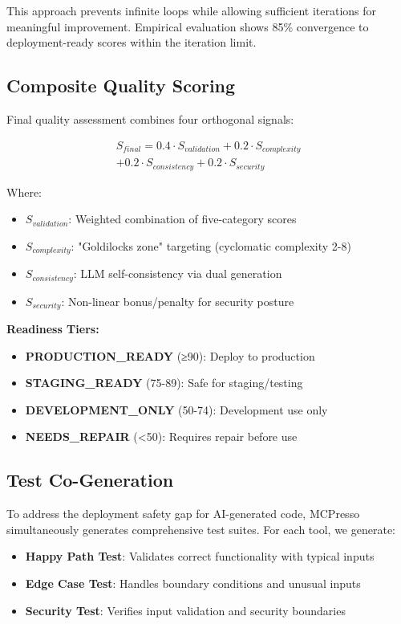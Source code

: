 \documentclass[10pt,twocolumn]{article}
\begin{document}
This approach prevents infinite loops while allowing sufficient iterations for meaningful improvement. Empirical evaluation shows 85\% convergence to deployment-ready scores within the iteration limit.

\subsection{Composite Quality Scoring}

Final quality assessment combines four orthogonal signals:

\begin{align}
S_{final} = 0.4 \cdot S_{validation} + 0.2 \cdot S_{complexity} \\
+ 0.2 \cdot S_{consistency} + 0.2 \cdot S_{security}
\end{align}

Where:
\begin{itemize}
\item $S_{validation}$: Weighted combination of five-category scores
\item $S_{complexity}$: "Goldilocks zone" targeting (cyclomatic complexity 2-8)
\item $S_{consistency}$: LLM self-consistency via dual generation
\item $S_{security}$: Non-linear bonus/penalty for security posture
\end{itemize}

\textbf{Readiness Tiers:}
\begin{itemize}
\item \textbf{PRODUCTION\_READY} (≥90): Deploy to production
\item \textbf{STAGING\_READY} (75-89): Safe for staging/testing
\item \textbf{DEVELOPMENT\_ONLY} (50-74): Development use only
\item \textbf{NEEDS\_REPAIR} (<50): Requires repair before use
\end{itemize}

\subsection{Test Co-Generation}

To address the deployment safety gap for AI-generated code, MCPresso simultaneously generates comprehensive test suites. For each tool, we generate:
\begin{itemize}
\item \textbf{Happy Path Test}: Validates correct functionality with typical inputs
\item \textbf{Edge Case Test}: Handles boundary conditions and unusual inputs
\item \textbf{Security Test}: Verifies input validation and security boundaries
\end{itemize}
\end{document}
